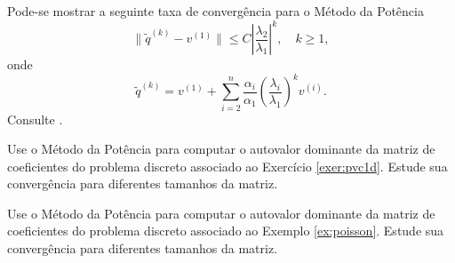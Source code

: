 \begin{obs}
  Pode-se mostrar a seguinte taxa de convergência para o Método da Potência
  \begin{equation}
    \|\tilde{q}^{(k)}-v^{(1)}\| \leq C\left|\frac{\lambda_2}{\lambda_1}\right|^k,\quad k\geq 1,
  \end{equation}
  onde
  \begin{equation}
    \tilde{q}^{(k)} = v^{(1)} + \sum_{i=2}^n \frac{\alpha_i}{\alpha_1}\left(\frac{\lambda_i}{\lambda_1}\right)^kv^{(i)}.
  \end{equation}
  Consulte \cite[Seção 5.3.]{Quarteroni2007}.
\end{obs}



\begin{exer}
  Use o Método da Potência para computar o autovalor dominante da matriz de coeficientes do problema discreto associado ao Exercício \ref{exer:pvc1d}. Estude sua convergência para diferentes tamanhos da matriz. 
\end{exer}

\begin{exer}
  Use o Método da Potência para computar o autovalor dominante da matriz de coeficientes do problema discreto associado ao Exemplo \ref{ex:poisson}. Estude sua convergência para diferentes tamanhos da matriz. 
\end{exer}